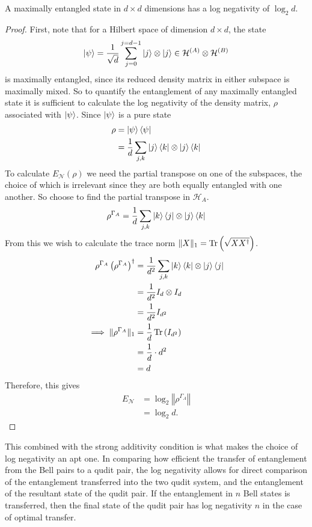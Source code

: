\begin{claim}
    \label{claim:maximally_entangled_states}
    A maximally entangled state in $d\times d$ dimensions has a log negativity of $\log_2d$.
\end{claim}
\begin{proof}
    First, note that for a Hilbert space of dimension $d\times d$, the state
    \begin{equation}
        \ket{\psi} = \frac{1}{\sqrt{d}}\sum_{j=0}^{j=d-1}\ket{j}\otimes\ket{j}\in \mathcal{H}^{(A)} \otimes \mathcal{H}^{(B)}
    \end{equation}
    is maximally entangled, since its reduced density matrix in either subspace is maximally mixed.
    So to quantify the entanglement of any maximally entangled state it is sufficient to calculate the log negativity of the density matrix, $\rho$ associated with $\ket{\psi}$.
    Since $\ket{\psi}$ is a pure state
    \begin{align}
        \rho &= \ket{\psi}\bra{\psi}\\
        &=\frac{1}{d} \sum_{j,k}\ket{j}\bra{k}\otimes\ket{j}\bra{k}
    \end{align}
    To calculate $E_{\mathcal{N}}(\rho)$ we need the partial transpose on one of the subspaces, the choice of which is irrelevant since they are both equally entangled with one another.
    So choose to find the partial transpose in $\mathcal{H}_A$.
    \begin{align}
        \rho^{\Gamma_A} =\frac{1}{d} \sum_{j,k}\ket{k}\bra{j}\otimes\ket{j}\bra{k}
    \end{align}
    From this we wish to calculate the trace norm $\Vert X\Vert_1 = \operatorname{Tr}\left(\sqrt{XX^{\dagger}}\right)$.
    \begin{align}
        \rho^{\Gamma_A}\left(\rho^{\Gamma_A}\right)^{\dagger} &= \frac{1}{d^2} \sum_{j,k}\ket{k}\bra{k}\otimes\ket{j}\bra{j}\\
        &=\frac{1}{d^2}I_d\otimes I_d\\
        &=\frac{1}{d^2}I_{d^2}\\
        \implies \Vert\rho^{\Gamma_A}\Vert_1 &= \frac{1}{d}\operatorname{Tr}{\left(I_{d^2}\right)}\\
        &= \frac{1}{d}\cdot d^2\\
        &= d
    \end{align}
    Therefore, this gives
    \begin{align}
        E_{\mathcal{N}} &= \log_2\left\Vert \rho^{\Gamma_A}\right\Vert\\
        &= \log_2d.
    \end{align}
\end{proof}
This combined with the strong additivity condition is what makes the choice of log negativity an apt one.
In comparing how efficient the transfer of entanglement from the Bell pairs to a qudit pair, the log negativity allows for direct comparison of the entanglement transferred into the two qudit system, and the entanglement of the resultant state of the qudit pair.
If the entanglement in $n$ Bell states is transferred, then the final state of the qudit pair has log negativity $n$ in the case of optimal transfer.